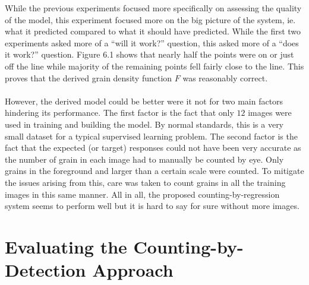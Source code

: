While the previous experiments focused more specifically on assessing the quality of the model, this experiment focused more on the big picture of the system, ie. what it predicted compared to what it should have predicted. While the first two experiments asked more of a ``will it work?'' question, this asked more of a ``does it work?'' question. Figure 6.1 shows that nearly half the points were on or just off the line while majority of the remaining points fell fairly close to the line. This proves that the derived grain density function $F$ was reasonably correct.\\ \\
%
However, the derived model could be better were it not for two main factors hindering its performance. The first factor is the fact that only $12$ images were used in training and building the model. By normal standards, this is a very small dataset for a typical supervised learning problem. The second factor is the fact that the expected (or target) responses could not have been very accurate as the number of grain in each image had to manually be counted by eye. Only grains in the foreground and larger than a certain scale were counted. To mitigate the issues arising from this, care was taken to count grains in all the training images in this same manner. All in all, the proposed counting-by-regression system seems to perform well but it is hard to say for sure without more images.

\section{Evaluating the Counting-by-Detection Approach}
